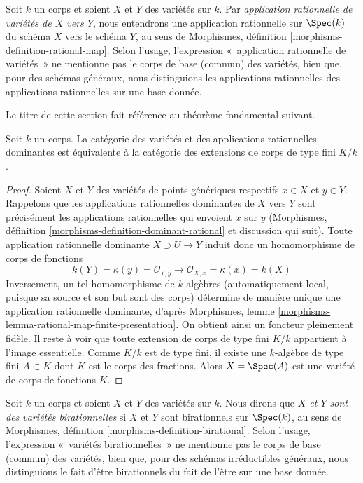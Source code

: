\noindent
Soit $k$ un corps et soient $X$ et $Y$ des variétés sur $k$.
Par {\it application rationnelle de variétés de $X$ vers $Y$}, nous entendrons
une application rationnelle sur $\Spec(k)$ du schéma $X$ vers le schéma $Y$,
au sens de Morphismes, définition \ref{morphisms-definition-rational-map}.
Selon l'usage, l'expression «~application rationnelle de variétés~» ne
mentionne pas le corps de base (commun) des variétés, bien que, pour des
schémas généraux, nous distinguions les applications rationnelles des
applications rationnelles sur une base donnée.

\medskip\noindent
Le titre de cette section fait référence au théorème fondamental suivant.

\begin{theorem}
\label{theorem-varieties-rational-maps}
Soit $k$ un corps. La catégorie des variétés
et des applications rationnelles dominantes est équivalente
à la catégorie des extensions de corps de type fini $K/k$.
\end{theorem}

\begin{proof}
Soient $X$ et $Y$ des variétés de points génériques respectifs
$x \in X$ et $y \in Y$. Rappelons que les applications rationnelles
dominantes de $X$ vers $Y$ sont précisément les applications
rationnelles qui envoient $x$ sur $y$ (Morphismes,
définition \ref{morphisms-definition-dominant-rational} et discussion
qui suit). Toute application rationnelle dominante $X
\supset U \to Y$ induit donc un homomorphisme de corps de fonctions
$$
k(Y) = \kappa(y) = \mathcal{O}_{Y, y}
\longrightarrow
\mathcal{O}_{X, x} = \kappa(x) = k(X)
$$
Inversement, un tel homomorphisme de $k$-algèbres (automatiquement
local, puisque sa source et son but sont des corps) détermine de
manière unique une application rationnelle dominante, d'après Morphismes,
lemme \ref{morphisms-lemma-rational-map-finite-presentation}. On obtient ainsi
un foncteur pleinement fidèle. Il reste à voir que toute extension de
corps de type fini $K/k$ appartient à l'image essentielle. Comme $K/k$
est de type fini, il existe une $k$-algèbre de type fini $A \subset K$
dont $K$ est le corps des fractions. Alors $X = \Spec(A)$ est une variété
de corps de fonctions $K$.
\end{proof}

\noindent
Soit $k$ un corps et soient $X$ et $Y$ des variétés sur $k$.
Nous dirons que {\it $X$ et $Y$ sont des variétés birationnelles}
si $X$ et $Y$ sont birationnels sur $\Spec(k)$, au sens de
Morphismes, définition \ref{morphisms-definition-birational}.
Selon l'usage, l'expression «~variétés birationnelles~» ne mentionne pas
le corps de base (commun) des variétés, bien que, pour des schémas
irréductibles généraux, nous distinguions le fait d'être birationnels
du fait de l'être sur une base donnée.

